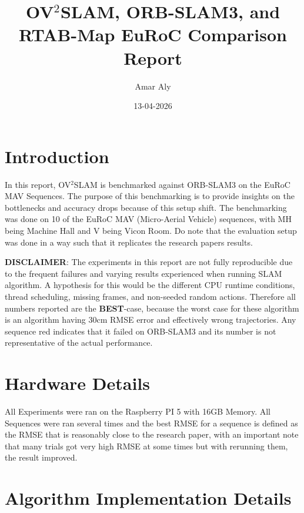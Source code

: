 \documentclass[11pt]{article}
\title{OV$^{2}$SLAM, ORB-SLAM3, and RTAB-Map EuRoC Comparison Report}
\author{Amar Aly}
\date{13-04-2026}
\begin{document}
\maketitle


\tableofcontents

\section{Introduction}

In this report, OV$^{2}$SLAM is benchmarked against ORB-SLAM3 on the EuRoC MAV Sequences. The purpose of this benchmarking is to provide insights on the bottlenecks and accuracy drops because of this setup shift. The benchmarking was done on 10 of the EuRoC MAV (Micro-Aerial Vehicle) sequences, with MH being Machine Hall and V being Vicon Room. Do note that the evaluation setup was done in a way such that it replicates the research papers results.

\textbf{DISCLAIMER}: The experiments in this report are not fully reproducible due to the frequent failures and varying results experienced when running SLAM algorithm. A hypothesis for this would be the different CPU runtime conditions, thread scheduling, missing frames, and non-seeded random actions. Therefore all numbers reported are the \textbf{BEST}-case, because the worst case for these algorithm is an algorithm having 30cm RMSE error and effectively wrong trajectories.
Any sequence red indicates that it failed on ORB-SLAM3 and its number is not representative of the actual performance.

\section{Hardware Details}
All Experiments were ran on the Raspberry PI 5 with 16GB Memory. All Sequences were ran several times and the best RMSE for a sequence is defined as the RMSE that is reasonably close to the research paper, with an important note that many trials got very high RMSE at some times but with rerunning them, the result improved.

\section{Algorithm Implementation Details}
\end{document}
